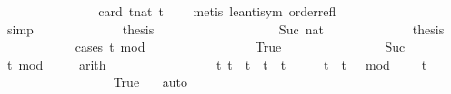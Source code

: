 \begin{isabellebody}
\ \ \ \ \ \ \ \ \ \ \isamarkupfalse%
\ \isamarkupfalse%
\ {\isacartoucheopen}{\isachardot}{\isachardot}{\isachardot}\ {\isacharequal}\ card\ {\isacharbraceleft}t{\isacharcolon}{\isacharcolon}nat{\isachardot}\ t\ {\isacharequal}\ {}{\isacharbraceright}{\isacartoucheclose}\ \isamarkupfalse%
\ {\isacharparenleft}metis\ le{\isacharunderscore}antisym\ order{\isacharunderscore}refl{\isacharparenright}\isanewline
\ \ \ \ \ \ \ \ \ \ \isamarkupfalse%
\ \isamarkupfalse%
\ {\isacartoucheopen}{\isachardot}{\isachardot}{\isachardot}\ {\isacharequal}\ {}{\isacartoucheclose}\ \isamarkupfalse%
\ simp\isanewline
\ \ \ \ \ \ \ \ \ \ \isamarkupfalse%
\ \isamarkupfalse%
\ {\isacharquery}thesis\ \isacommand{{\isachardot}}\isamarkupfalse%
\ \isanewline
\ \ \ \ \ \ \isamarkupfalse%
\isanewline
\ \ \ \ \ \ \ \ \isamarkupfalse%
\ {\isacharparenleft}Suc\ nat{\isacharparenright}\isanewline
\ \ \ \ \ \ \ \ \ \ \isamarkupfalse%
\ \isamarkupfalse%
\ {\isacharquery}thesis\isanewline
\ \ \ \ \ \ \ \ \ \ \isamarkupfalse%
\ {\isacharparenleft}cases\ {\isacartoucheopen}{\isacharparenleft}t\ mod\ {}\ {\isacharequal}\ {}{\isacartoucheclose}{\isacharparenright}\isanewline
\ \ \ \ \ \ \ \ \ \ \ \ \isamarkupfalse%
\ True\isanewline
\ \ \ \ \ \ \ \ \ \ \ \ \ \ \isamarkupfalse%
\ Suc\ \isamarkupfalse%
\ {\isacartoucheopen}t\ mod\ {}\ {\isasymnoteq}\ {}{\isacartoucheclose}\ \isamarkupfalse%
\ arith\ \isanewline
\ \ \ \ \ \ \ \ \ \ \ \ \ \ \isamarkupfalse%
\ {\isacartoucheopen}{\isacharbraceleft}t{\isachardot}\ {\isacharparenleft}t\ {\isacharequal}\ t\ {\isasymor}\ t\ {\isacharequal}\ t\ {\isacharplus}\ {}{\isacharparenright}\ {\isasymand}\ {}\ {\isasymle}\ t\ {\isasymand}\ {\isacharparenleft}t\ {\isacharminus}\ {}{\isacharparenright}\ mod\ {}\ {\isacharequal}\ {}{\isacharbraceright}\ {\isacharequal}\ {\isacharbraceleft}t\isanewline
\ \ \ \ \ \ \ \ \ \ \ \ \ \ \ \ \isamarkupfalse%
\ True\ \ \isamarkupfalse%
\ auto\isanewline

\end{isabellebody}
